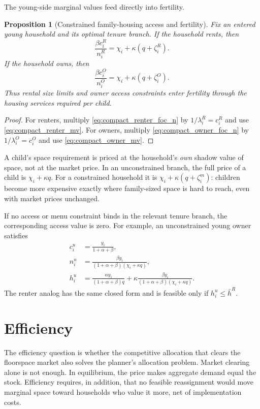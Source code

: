 \documentclass[11pt]{article}
\newtheorem{proposition}{Proposition}
\newcommand{\1}{\mathbf 1}
\begin{document}
The young-side marginal values feed directly into fertility.

\begin{proposition}[Constrained family-housing access and fertility]
Fix an entered young household and its optimal tenure branch. If the household rents, then
\[
\frac{\beta c_i^R}{n_i^R}
=
\chi_i+\kappa(q+\zeta_i^R).
\]
If the household owns, then
\[
\frac{\beta c_i^O}{n_i^O}
=
\chi_i+\kappa(q+\zeta_i^O).
\]
Thus rental size limits and owner access constraints enter fertility through the housing services required per child.
\end{proposition}

\begin{proof}
For renters, multiply \eqref{eq:compact_renter_foc_n} by $1/\lambda_i^R=c_i^R$ and use \eqref{eq:compact_renter_mv}. For owners, multiply \eqref{eq:compact_owner_foc_n} by $1/\lambda_i^O=c_i^O$ and use \eqref{eq:compact_owner_mv}.
\end{proof}

A child's space requirement is priced at the household's \emph{own} shadow value of space, not at the market price. In an unconstrained branch, the full price of a child is $\chi_i+\kappa q$. For a constrained household it is $\chi_i+\kappa(q+\zeta_i^m)$: children become more expensive exactly where family-sized space is hard to reach, even with market prices unchanged.

If no access or menu constraint binds in the relevant tenure branch, the corresponding access value is zero. For example, an unconstrained young owner satisfies
\begin{align*}
c_i^u&=\frac{y_i}{1+\alpha+\beta},
\\
n_i^u&=\frac{\beta y_i}{(1+\alpha+\beta)(\chi_i+\kappa q)},
\\
h_i^u&=\frac{\alpha y_i}{(1+\alpha+\beta)q}
+
\kappa\frac{\beta y_i}{(1+\alpha+\beta)(\chi_i+\kappa q)}.
\end{align*}
The renter analog has the same closed form and is feasible only if $h_i^u\le\bar h^R$.

\section{Efficiency}

The efficiency question is whether the competitive allocation that clears the floorspace market also solves the planner's allocation problem. Market clearing alone is not enough. In equilibrium, the price makes aggregate demand equal the stock. Efficiency requires, in addition, that no feasible reassignment would move marginal space toward households who value it more, net of implementation costs.
\end{document}
